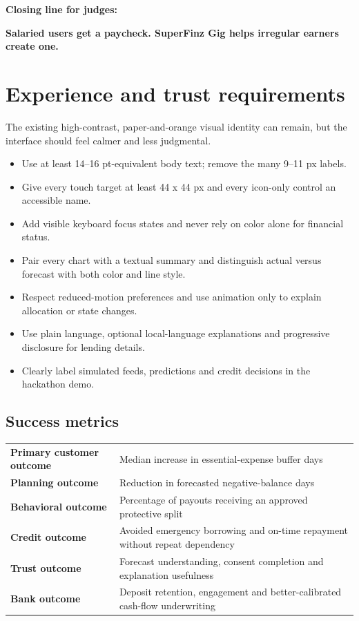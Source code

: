 \documentclass[10pt,a4paper]{article}
\begin{document}
\textbf{Closing line for judges:}

\begin{accentbox}
\centering
{\Large\bfseries Salaried users get a paycheck. SuperFinz Gig helps irregular earners create one.}
\end{accentbox}

\section{Experience and trust requirements}

The existing high-contrast, paper-and-orange visual identity can remain, but the interface should feel calmer and less judgmental.

\begin{itemize}
  \item Use at least 14--16 pt-equivalent body text; remove the many 9--11 px labels.
  \item Give every touch target at least 44 x 44 px and every icon-only control an accessible name.
  \item Add visible keyboard focus states and never rely on color alone for financial status.
  \item Pair every chart with a textual summary and distinguish actual versus forecast with both color and line style.
  \item Respect reduced-motion preferences and use animation only to explain allocation or state changes.
  \item Use plain language, optional local-language explanations and progressive disclosure for lending details.
  \item Clearly label simulated feeds, predictions and credit decisions in the hackathon demo.
\end{itemize}

\subsection{Success metrics}

\begin{tabularx}{\textwidth}{>{\bfseries}p{51mm} X}
Primary customer outcome & Median increase in essential-expense buffer days \\
Planning outcome & Reduction in forecasted negative-balance days \\
Behavioral outcome & Percentage of payouts receiving an approved protective split \\
Credit outcome & Avoided emergency borrowing and on-time repayment without repeat dependency \\
Trust outcome & Forecast understanding, consent completion and explanation usefulness \\
Bank outcome & Deposit retention, engagement and better-calibrated cash-flow underwriting \\
\end{tabularx}
\end{document}
